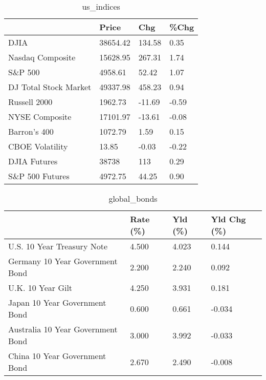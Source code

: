 \documentclass{article}%
\begin{document}
%


\begin{table}[htbp]%
\caption{us\_indices}%
\centering%
\begin{adjustbox}{width=1\textwidth}%
\begin{tabular}{llll}
\toprule
                      &    Price &    Chg &  \%Chg \\
\midrule
                 DJIA & 38654.42 & 134.58 &  0.35 \\
     Nasdaq Composite & 15628.95 & 267.31 &  1.74 \\
              S\&P 500 &  4958.61 &  52.42 &  1.07 \\
DJ Total Stock Market & 49337.98 & 458.23 &  0.94 \\
         Russell 2000 &  1962.73 & -11.69 & -0.59 \\
       NYSE Composite & 17101.97 & -13.61 & -0.08 \\
         Barron's 400 &  1072.79 &   1.59 &  0.15 \\
      CBOE Volatility &    13.85 &  -0.03 & -0.22 \\
         DJIA Futures &    38738 &    113 &  0.29 \\
      S\&P 500 Futures &  4972.75 &  44.25 &  0.90 \\
\bottomrule
\end{tabular}
%
\end{adjustbox}%
\end{table}

%


\begin{table}[htbp]%
\caption{global\_bonds}%
\centering%
\begin{adjustbox}{width=1\textwidth}%
\begin{tabular}{llll}
\toprule
                                  & Rate (\%) & Yld (\%) & Yld Chg (\%) \\
\midrule
       U.S. 10 Year Treasury Note &    4.500 &   4.023 &       0.144 \\
  Germany 10 Year Government Bond &    2.200 &   2.240 &       0.092 \\
                U.K. 10 Year Gilt &    4.250 &   3.931 &       0.181 \\
    Japan 10 Year Government Bond &    0.600 &   0.661 &      -0.034 \\
Australia 10 Year Government Bond &    3.000 &   3.992 &      -0.033 \\
    China 10 Year Government Bond &    2.670 &   2.490 &      -0.008 \\
\bottomrule
\end{tabular}
%
\end{adjustbox}%
\end{table}
\end{document}
